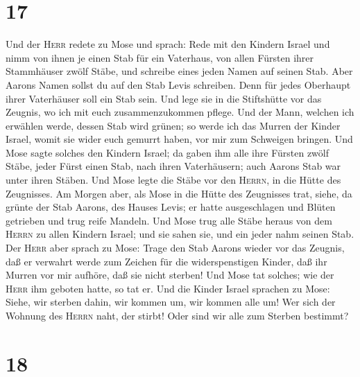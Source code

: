 \hypertarget{section-16}{%
\section{17}\label{section-16}}

 Und der \textsc{Herr} redete zu Mose und sprach: Rede mit
den Kindern Israel und nimm von ihnen je einen Stab für ein Vaterhaus,
 von allen Fürsten ihrer Stammhäuser zwölf Stäbe, und
schreibe eines jeden Namen auf seinen Stab.  Aber Aarons
Namen sollst du auf den Stab Levis schreiben. Denn für jedes Oberhaupt
ihrer Vaterhäuser soll ein Stab sein.  Und lege sie in die
Stiftshütte vor das Zeugnis, wo ich mit euch zusammenzukommen pflege.
 Und der Mann, welchen ich erwählen werde, dessen Stab
wird grünen; so werde ich das Murren der Kinder Israel, womit sie wider
euch gemurrt haben, vor mir zum Schweigen bringen.  Und
Mose sagte solches den Kindern Israel; da gaben ihm alle ihre Fürsten
zwölf Stäbe, jeder Fürst einen Stab, nach ihren Vaterhäusern; auch
Aarons Stab war unter ihren Stäben.  Und Mose legte die
Stäbe vor den \textsc{Herrn}, in die Hütte des Zeugnisses.
 Am Morgen aber, als Mose in die Hütte des Zeugnisses
trat, siehe, da grünte der Stab Aarons, des Hauses Levis; er hatte
ausgeschlagen und Blüten getrieben und trug reife Mandeln.
 Und Mose trug alle Stäbe heraus von dem \textsc{Herrn} zu
allen Kindern Israel; und sie sahen sie, und ein jeder nahm seinen Stab.
 Der \textsc{Herr} aber sprach zu Mose: Trage den Stab
Aarons wieder vor das Zeugnis, daß er verwahrt werde zum Zeichen für die
widerspenstigen Kinder, daß ihr Murren vor mir aufhöre, daß sie nicht
sterben!  Und Mose tat solches; wie der \textsc{Herr} ihm
geboten hatte, so tat er.  Und die Kinder Israel sprachen
zu Mose: Siehe, wir sterben dahin, wir kommen um, wir kommen alle um!
 Wer sich der Wohnung des \textsc{Herrn} naht, der
stirbt! Oder sind wir alle zum Sterben bestimmt?

\hypertarget{section-17}{%
\section{18}\label{section-17}}

